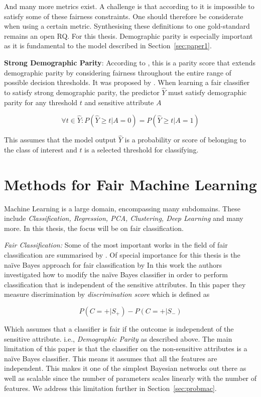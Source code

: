 And many more metrics exist. A challenge is that according to \citet{Mehrabi:2021:CSUR, Kleinberg:2017:LIPIcs} it is impossible to satisfy some of these fairness constraints. One should therefore be considerate when using a certain metric. Synthesising these definitions to one gold-standard remains an open RQ. For this thesis. Demographic parity is especially important as it is fundamental to the model described in Section~\ref{sec:paper1}.

\textbf{Strong Demographic Parity}: According to \citet{Antonio:2021:arXiv}, this is a parity score that extends demographic parity by considering fairness throughout the entire range of possible decision thresholds. It was proposed by \citet{Jiang:2020:PMLR}. When learning a fair classifier to satisfy strong demographic parity, the predictor $\hat{Y}$ must satisfy demographic parity for any threshold $t$ and sensitive attribute $A$

$$
\forall t \in \hat{Y} : P(\hat{Y} \geq t | A = 0) = P(\hat{Y} \geq t | A = 1)
$$

This assumes that the model output $\hat{Y}$ is a probability or score of belonging to the class of interest and $t$ is a selected threshold for classifying.

\section{Methods for Fair Machine Learning}

Machine Learning is a large domain, encompassing many subdomains. These include \textit{Classification, Regression, PCA, Clustering, Deep Learning} and many more. In this thesis, the focus will be on fair classification. 

\textit{Fair Classification:} Some of the most important works in the field of fair classification are summarised by \cite{Mehrabi:2021:CSUR}. Of special importance for this thesis is the naïve Bayes approach for fair classification by \citet{Calders:20210:DMKD} In this work the authors investigated how to modify the naïve Bayes classifier in order to perform classification that is independent of the sensitive attributes. In this paper they measure discrimination by \textit{discrimination score} which is defined as

\begin{equation*}
    P(C=+|S_+) - P(C=+|S_-)
\end{equation*}

Which assumes that a classifier is fair if the outcome is independent of the sensitive attribute. i.e., \textit{Demographic Parity} as described above. The main limitation of this paper is that the classifier on the non-sensitive attributes is a naïve Bayes classifier. This means it assumes that all the features are independent. This makes it one of the simplest Bayesian networks out there as well as scalable since the number of parameters scales linearly with the number of features. We address this limitation further in Section~\ref{sec:probmac}.


